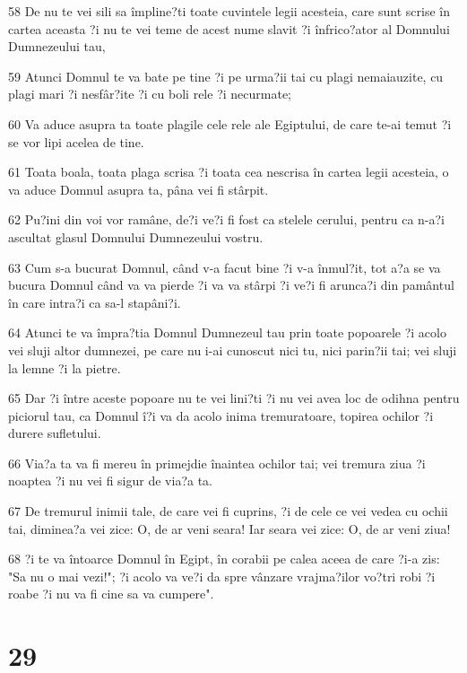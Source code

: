 \par 58 De nu te vei sili sa împline?ti toate cuvintele legii acesteia, care sunt scrise în cartea aceasta ?i nu te vei teme de acest nume slavit ?i înfrico?ator al Domnului Dumnezeului tau,
\par 59 Atunci Domnul te va bate pe tine ?i pe urma?ii tai cu plagi nemaiauzite, cu plagi mari ?i nesfâr?ite ?i cu boli rele ?i necurmate;
\par 60 Va aduce asupra ta toate plagile cele rele ale Egiptului, de care te-ai temut ?i se vor lipi acelea de tine.
\par 61 Toata boala, toata plaga scrisa ?i toata cea nescrisa în cartea legii acesteia, o va aduce Domnul asupra ta, pâna vei fi stârpit.
\par 62 Pu?ini din voi vor ramâne, de?i ve?i fi fost ca stelele cerului, pentru ca n-a?i ascultat glasul Domnului Dumnezeului vostru.
\par 63 Cum s-a bucurat Domnul, când v-a facut bine ?i v-a înmul?it, tot a?a se va bucura Domnul când va va pierde ?i va va stârpi ?i ve?i fi arunca?i din pamântul în care intra?i ca sa-l stapâni?i.
\par 64 Atunci te va împra?tia Domnul Dumnezeul tau prin toate popoarele ?i acolo vei sluji altor dumnezei, pe care nu i-ai cunoscut nici tu, nici parin?ii tai; vei sluji la lemne ?i la pietre.
\par 65 Dar ?i între aceste popoare nu te vei lini?ti ?i nu vei avea loc de odihna pentru piciorul tau, ca Domnul î?i va da acolo inima tremuratoare, topirea ochilor ?i durere sufletului.
\par 66 Via?a ta va fi mereu în primejdie înaintea ochilor tai; vei tremura ziua ?i noaptea ?i nu vei fi sigur de via?a ta.
\par 67 De tremurul inimii tale, de care vei fi cuprins, ?i de cele ce vei vedea cu ochii tai, diminea?a vei zice: O, de ar veni seara! Iar seara vei zice: O, de ar veni ziua!
\par 68 ?i te va întoarce Domnul în Egipt, în corabii pe calea aceea de care ?i-a zis: "Sa nu o mai vezi!"; ?i acolo va ve?i da spre vânzare vrajma?ilor vo?tri robi ?i roabe ?i nu va fi cine sa va cumpere".

\chapter{29}

